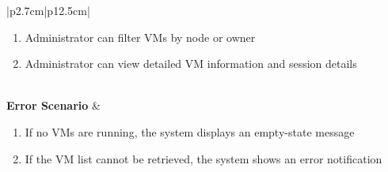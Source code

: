 \begin{table}[H]
\begin{tabular}{|p{2.7cm}|p{12.5cm}|}
\begin{minipage}[t]{\linewidth}
\begin{enumerate}[topsep=0pt,itemsep=1pt,parsep=0pt,partopsep=0pt]
                                          \item Administrator can filter VMs by node or owner
                                          \item Administrator can view detailed VM information and session details
                                      \end{enumerate}
                                  \end{minipage}                \\
        \hline
        \textbf{Error Scenario} & \begin{minipage}[t]{\linewidth}
                                      \begin{enumerate}[topsep=0pt,itemsep=1pt,parsep=0pt,partopsep=0pt]
                                          \item If no VMs are running, the system displays an empty-state message
                                          \item If the VM list cannot be retrieved, the system shows an error notification
                                      \end{enumerate}
                                  \end{minipage}         \\
        \hline
    \end{tabular}
    \label{tab:admin-running-vms}
\end{table}
